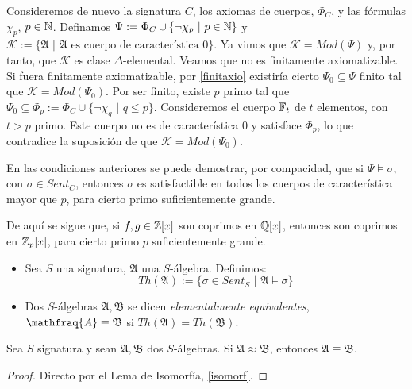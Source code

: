 \begin{example}
Consideremos de nuevo la signatura $C$, los axiomas de cuerpos, $\Phi_C$, y las fórmulas $\chi_p$, $p \in \mathbb{N}$. Definamos $\Psi := \Phi_C \cup \{\neg\chi_p \, \, | \, \, p\in \mathbb{N} \}$ y $\mathcal{K} :=\{\mathfrak{A} \, \, | \, \, \mathfrak{A} \text{ es cuerpo de característica 0}\}$. Ya vimos que $\mathcal{K} = Mod(\Psi)$ y, por tanto, que $\mathcal{K}$ es clase $\Delta$-elemental. Veamos que no es finitamente axiomatizable.\\

Si fuera finitamente axiomatizable, por \ref{finitaxio} existiría cierto $\Psi_0 \subseteq \Psi$ finito tal que $\mathcal{K} = Mod(\Psi_0)$. Por ser finito, existe $p$ primo tal que $\Psi_0 \subseteq \Phi_p := \Phi_C \cup \{\neg\chi_q \, \, | \, \, q \leq p \}$. Consideremos el cuerpo $\mathbb{F}_t$ de $t$ elementos, con $t > p$ primo. Este cuerpo no es de característica 0 y satisface $\Phi_p$, lo que contradice la suposición de que $\mathcal{K} = Mod(\Psi_0)$.
\end{example}


\begin{example}
En las condiciones anteriores se puede demostrar, por compacidad, que si $\Psi \vDash \sigma$, con $\sigma \in Sent_C$, entonces $\sigma$ es satisfactible en todos los cuerpos de característica mayor que $p$, para cierto primo suficientemente grande.

De aquí se sigue que, si $f, g \in \mathbb{Z}[x]$ son coprimos en $\mathbb{Q}[x]$, entonces son coprimos en $\mathbb{Z}_p[x]$, para cierto primo $p$ suficientemente grande.
\end{example}

\begin{defs}
\begin{itemize}\mbox{}
    \item Sea $S$ una signatura, $\mathfrak{A}$ una $S$-álgebra. Definimos:
$$Th(\mathfrak{A}) := \{\sigma \in Sent_S \, \, | \, \, \mathfrak{A}\vDash \sigma\}$$
    \item Dos $S$-álgebras $\mathfrak{A}, \mathfrak{B}$ se dicen \textit{elementalmente equivalentes}, $\mathfraq{A} \equiv \mathfrak{B}$ si $Th(\mathfrak{A}) = Th(\mathfrak{B})$.
\end{itemize}
\end{defs}

\begin{prop}\label{equiso}
Sea $S$ signatura y sean $\mathfrak{A}, \mathfrak{B}$ dos $S$-álgebras. Si $\mathfrak{A} \approx \mathfrak{B}$, entonces $\mathfrak{A} \equiv \mathfrak{B}$.
\end{prop}
\begin{proof}
Directo por el Lema de Isomorfía, \ref{isomorf}.
\end{proof}


